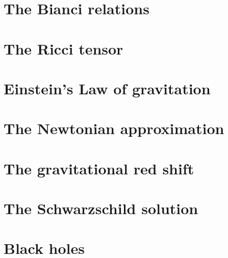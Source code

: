\documentclass[12pt]{article}
\numberwithin{equation}{section}
\begin{document}
\section{The Bianci relations}

\section{The Ricci tensor}

\section{Einstein's Law of gravitation}

\section{The Newtonian approximation}

\section{The gravitational red shift}

\section{The Schwarzschild solution}

\section{Black holes}

\end{document}
